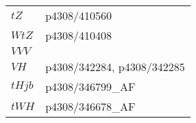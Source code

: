\begin{table}[h!]
\begin{tabular}{p{1.5cm}p{13.5cm}}
        $tZ$         & p4308/410560                                                         \\
        $WtZ$        & p4308/410408                                                         \\
        $VVV$        &                                               \\
        $VH$         & p4308/342284, p4308/342285                                           \\
        $tHjb$       & p4308/346799\_AF                                                     \\
        $tWH$        & p4308/346678\_AF                                                     \\
        \bottomrule
    \end{tabular}
\end{table}

\newpage